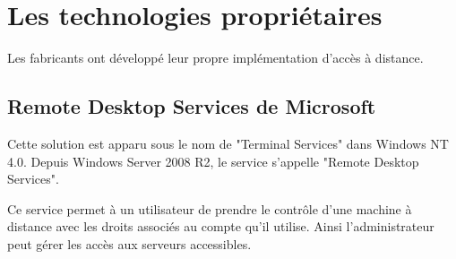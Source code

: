 \section{Les technologies propriétaires}
Les fabricants ont développé leur propre implémentation d'accès à distance.
\subsection{Remote Desktop Services de Microsoft}
Cette solution est apparu sous le nom de "Terminal Services" dans Windows NT 4.0.
Depuis Windows Server 2008 R2, le service s'appelle "Remote Desktop Services".

Ce service permet à un utilisateur de prendre le contrôle d'une machine à distance avec les droits associés au compte qu'il utilise.
Ainsi l'administrateur peut gérer les accès aux serveurs accessibles. 

